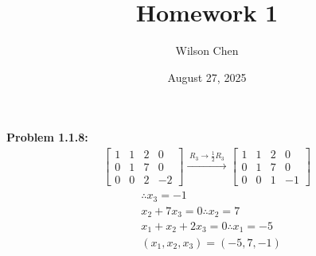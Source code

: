 \documentclass[12pt]{article}
\title{Homework 1}
\author{Wilson Chen}
\date{August 27, 2025}
\begin{document}
\maketitle

\textbf{Problem 1.1.8:} \begin{align*}
    \begin{bmatrix}
        1 & 1 & 2 & 0 \\
        0 & 1 & 7 & 0 \\
        0 & 0 & 2 & -2
    \end{bmatrix} 
    \xrightarrow{\; R_3 \to \frac{1}{2}R_3 \;}
    \begin{bmatrix}
        1 & 1 & 2 & 0 \\
        0 & 1 & 7 & 0 \\
        0 & 0 & 1 & -1
    \end{bmatrix}
\end{align*}\begin{align*}
    & \therefore x_3 = -1 \\[6pt]
    & x_2 + 7x_3 = 0 \therefore x_2 = 7 \\[6pt]
    & x_1 + x_2 + 2x_3 = 0 \therefore x_1 = -5 \\[6pt]
    & \boxed{(x_1, x_2, x_3) = (-5, 7, -1)}
\end{align*}

\newpage
\end{document}
